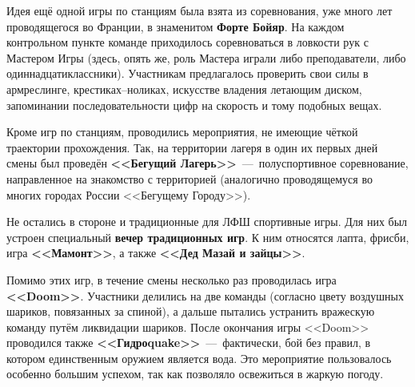 \documentclass[12pt,a4paper,oneside]{scrartcl}
\newlength{\h}
\newlength{\x}
\begin{document}
Идея ещё одной игры по станциям была взята из соревнования, уже много
лет проводящегося во Франции, в знаменитом \textbf{Форте Бойяр}. На
каждом контрольном пункте команде приходилось соревноваться в ловкости
рук с Мастером Игры (здесь, опять же, роль Мастера играли либо
преподаватели, либо одиннадцатиклассники). Участникам предлагалось
проверить свои силы в армреслинге, крестиках--ноликах, искусстве
владения летающим диском, запоминании последовательности цифр на
скорость и тому подобных вещах.

\begin{figure}[h]
  \centering
  \hspace{0.05\textwidth}
\end{figure}


Кроме игр по станциям, проводились мероприятия, не имеющие чёткой
траектории прохождения. Так, на территории лагеря в один их первых
дней смены был проведён \textbf{<<Бегущий Лагерь>>}~---~полуспортивное
соревнование, направленное на знакомство с территорией (аналогично
проводящемуся во многих городах России <<Бегущему Городу>>). 

Не остались в стороне и традиционные для ЛФШ спортивные игры. Для них
был устроен специальный \textbf{вечер традиционных игр}. К ним
относятся лапта, фрисби, игра \textbf{<<Мамонт>>}, а также
\textbf{<<Дед Мазай и зайцы>>}.

\begin{figure}[h]
  \centering
  \hspace{0.05\textwidth}
\end{figure}


Помимо этих игр, в течение смены несколько раз проводилась игра
\textbf{<<Doom>>}. Участники делились на две команды (согласно цвету
воздушных шариков, повязанных за спиной), а дальше пытались устранить
вражескую команду путём ликвидации шариков. После окончания игры
<<Doom>> проводился также \textbf{<<Гидроquake>>}~---~фактически, бой
без правил, в котором единственным оружием является вода. Это
мероприятие пользовалось особенно большим успехом, так как позволяло
освежиться в жаркую погоду.

\begin{figure}[h]
  \centering
  \hspace{0.05\textwidth}
\end{figure}
\end{document}
